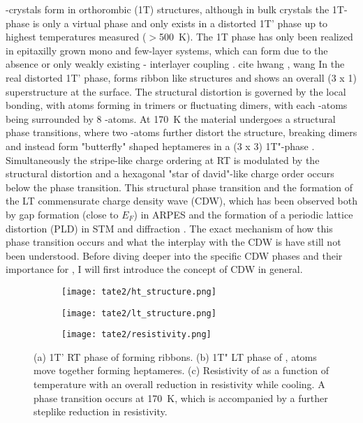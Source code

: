 -crystals form in orthorombic (1T) structures, although in bulk crystals the 1T-phase is only a virtual phase and only exists in a distorted 1T' phase up to highest temperatures measured ($>$\qty{500}{\kelvin}).
The 1T phase has only been realized in epitaxilly grown mono and few-layer systems, which can form due to the absence or only weakly existing - interlayer coupling \cite{}. cite hwang , wang
In the real distorted 1T' phase,  forms ribbon like structures and shows an overall (3 x 1) superstructure at the surface.
The structural distortion is governed by the local bonding, with  atoms forming in trimers or fluctuating dimers, with each -atoms being surrounded by 8 -atoms.
At \qty{170}{\kelvin} the material undergoes a structural phase transitions, where two -atoms further distort the structure, breaking dimers and instead form "butterfly" shaped heptameres in a (3 x 3) 1T"-phase \cite{feng_charge_2016, katayama_observation_2023}.
Simultaneously the stripe-like charge ordering at RT is modulated by the structural distortion and a hexagonal "star of david"-like charge order occurs below the phase transition.
This structural phase transition and the formation of the LT commensurate charge density wave (CDW), which has been observed both by gap formation (close to $E_F$) in ARPES \cite{lin_evidence_2022, mitsuishi_unveiling_2024} and the formation of a periodic lattice distortion (PLD) in STM and diffraction \cite{feng_charge_2016, siddiqui_ultrafast_2021, domrose_femtosecond_2024}.
The exact mechanism of how this phase transition occurs and what the interplay with the CDW is have still not been understood.
Before diving deeper into the specific CDW phases and their importance for , I will first introduce the concept of CDW in general.

\begin{figure}
	\centering
	\begin{subfigure}[b]{0.3\textwidth}
		\texttt{[image: tate2/ht\_structure.png]}
	\end{subfigure}
	\hfill
	\begin{subfigure}[b]{0.3\textwidth}
		\texttt{[image: tate2/lt\_structure.png]}
	\end{subfigure}
	\hfill
	\begin{subfigure}[b]{0.3\textwidth}
		\texttt{[image: tate2/resistivity.png]}
	\end{subfigure}
	\caption{(a) 1T' RT phase of  forming ribbons. (b) 1T" LT phase of ,  atoms move together forming heptameres. (c) Resistivity of  as a function of temperature with an overall reduction in resistivity while cooling. A phase transition occurs at \qty{170}{\kelvin}, which is accompanied by a further steplike reduction in resistivity.}
	\label{fig:tate_structure}
\end{figure}

